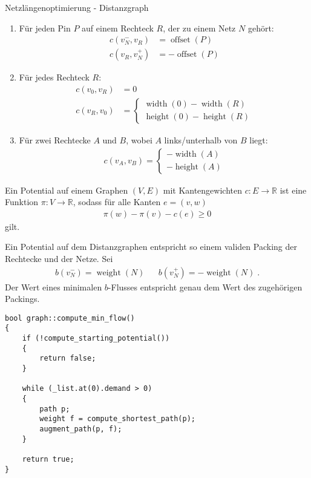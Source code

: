 \documentclass{beamer}
\DeclareMathOperator{\hoehe}{height}
\DeclareMathOperator{\breite}{width}
\DeclareMathOperator{\ausmenge}{offset}
\DeclareMathOperator{\gewicht}{weight}
\begin{document}
\begin{frame}{Netzlängenoptimierung - Distanzgraph}
 \begin{enumerate}
   \item Für jeden Pin $P$ auf einem Rechteck $R$, der zu einem Netz $N$ gehört:
   \begin{align*}
    c(v_N^-, v_R) &= \ausmenge(P)\\
    c(v_R, v_N^+) &= -\ausmenge(P)
   \end{align*}
   \item Für jedes Rechteck $R$:
   \begin{align*}
    c(v_0, v_R) &= 0 \\
    c(v_R, v_0) &= \begin{cases}\breite(0) - \breite(R) \\ \hoehe(0) - \hoehe(R)\end{cases}
   \end{align*}
   \item Für zwei Rechtecke $A$ und $B$, wobei $A$ links/unterhalb von $B$ liegt:
   \begin{align*}
    c(v_A, v_B) = \begin{cases} -\breite(A) \\
    -\hoehe(A)\end{cases}
   \end{align*}
 \end{enumerate}

\end{frame}

\begin{frame}
 \begin{definition}[Potential]
  Ein Potential auf einem Graphen $(V,E)$ mit Kantengewichten $c\colon E \to \mathbb{R}$ ist eine Funktion $\pi\colon V\to \mathbb{R}$, sodass für alle Kanten $e=(v,w)$
  \begin{align*}
   \pi(w) - \pi(v) - c(e) \geq 0
  \end{align*}
  gilt.
 \end{definition}
 
 Ein Potential auf dem Distanzgraphen entspricht so einem validen Packing der Rechtecke und der Netze. Sei 
 \begin{align*}
  b(v_N^-) = \gewicht(N) && b(v_N^+) = -\gewicht(N)\;.
 \end{align*}
 Der Wert eines minimalen $b$-Flusses entspricht genau dem Wert des zugehörigen Packings.
\end{frame}

\begin{frame}[fragile]
\begin{lstlisting}[basicstyle=\scriptsize]
bool graph::compute_min_flow()
{
    if (!compute_starting_potential())
    {
        return false;
    }

    while (_list.at(0).demand > 0)
    {
        path p;
        weight f = compute_shortest_path(p);
        augment_path(p, f);
    }

    return true;
}
\end{lstlisting}
\end{frame}
\end{document}
